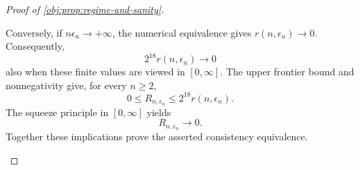 \documentclass[11pt]{article}
\begin{document}
\begin{proof}[Proof of \cref{obj:prop:regime-and-sanity}]
\begin{enumerate}
Conversely, if \(n\epsilon_n\to+\infty\), the numerical equivalence gives
\(r(n,\epsilon_n)\to0\). Consequently,
\[
2^{18}r(n,\epsilon_n)\longrightarrow0
\]
also when these finite values are viewed in \([0,\infty]\).
The upper frontier bound and nonnegativity give, for every \(n\ge2\),
\[
0\le R_{n,\epsilon_n}\le2^{18}r(n,\epsilon_n).
\]
The squeeze principle in \([0,\infty]\) yields
\[
R_{n,\epsilon_n}\longrightarrow0.
\]
Together these implications prove the asserted consistency equivalence.
\end{enumerate}
\end{proof}




\end{document}
